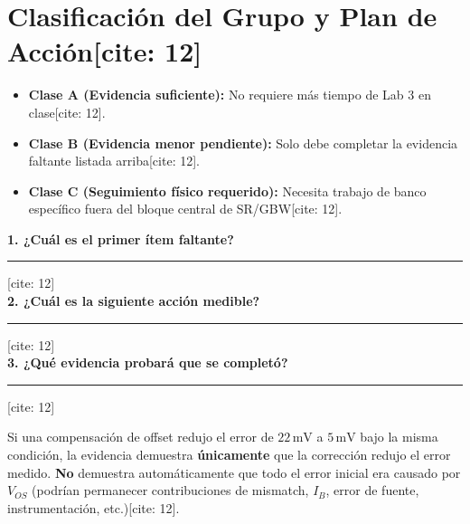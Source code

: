 \documentclass[11pt, a4paper]{article}
\begin{document}
\section*{Clasificación del Grupo y Plan de Acción[cite: 12]}
\begin{itemize}
    \item[$\square$] \textbf{Clase A (Evidencia suficiente):} No requiere más tiempo de Lab 3 en clase[cite: 12].
    \item[$\square$] \textbf{Clase B (Evidencia menor pendiente):} Solo debe completar la evidencia faltante listada arriba[cite: 12].
    \item[$\square$] \textbf{Clase C (Seguimiento físico requerido):} Necesita trabajo de banco específico fuera del bloque central de SR/GBW[cite: 12].
\end{itemize}

\vspace{0.3cm}
\textbf{1. ¿Cuál es el primer ítem faltante?} \rule{10cm}{0.4pt}[cite: 12] \\
\textbf{2. ¿Cuál es la siguiente acción medible?} \rule{9cm}{0.4pt}[cite: 12] \\
\textbf{3. ¿Qué evidencia probará que se completó?} \rule{8cm}{0.4pt}[cite: 12]

\begin{tcolorbox}[colback=white, colframe=black, title=\textbf{Nota de Interpretación Conceptual[cite: 12]}]
    Si una compensación de offset redujo el error de $22\,\text{mV}$ a $5\,\text{mV}$ bajo la misma condición, la evidencia demuestra \textbf{únicamente} que la corrección redujo el error medido. \textbf{No} demuestra automáticamente que todo el error inicial era causado por $V_{OS}$ (podrían permanecer contribuciones de mismatch, $I_B$, error de fuente, instrumentación, etc.)[cite: 12].
\end{tcolorbox}
\end{document}
